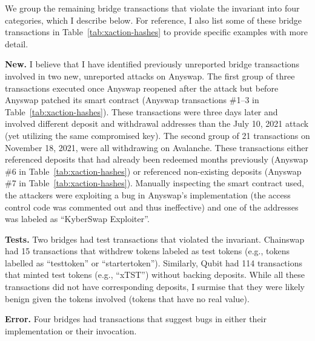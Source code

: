 We group the remaining bridge transactions that violate the invariant
into four categories, which I describe below.  For reference, I also
list some of these bridge transactions in
Table~\ref{tab:xaction-hashes} to provide specific
examples with more detail.



\newcommand{\pgraph}[1]{\vspace*{0.1in}\noindent\textbf{#1}}

\pgraph{New.}  I believe that I have identified
previously unreported bridge transactions involved in two new,
unreported attacks on Anyswap.
The first group of three transactions executed once Anyswap reopened
after the attack but before Anyswap patched its smart contract
(Anyswap transactions \#1--3 in Table~\ref{tab:xaction-hashes}).  These transactions were three days later and involved
different deposit and withdrawal addresses than the July 10, 2021
attack (yet utilizing the same compromised key).  The second group of 21 transactions on November 18, 2021,
were all withdrawing on Avalanche.  These
transactions either referenced deposits that had already been redeemed
months previously (Anyswap \#6 in Table~\ref{tab:xaction-hashes}) or referenced non-existing deposits (Anyswap \#7 in Table~\ref{tab:xaction-hashes}).  Manually
inspecting the smart contract used, the attackers were exploiting a
bug in Anyswap's implementation (the access control code was commented
out and thus ineffective) and one of the addresses was labeled as ``KyberSwap Exploiter''. 


\pgraph{Tests.}  Two bridges had test transactions that violated the
invariant.
%
Chainswap had 15 transactions that withdrew tokens labeled as test
tokens (e.g., tokens labelled as ``testtoken'' or ``startertoken''). Similarly, Qubit had 114 transactions that minted test tokens (e.g., ``xTST'') without backing deposits.
While all these transactions did not have corresponding deposits, I surmise that they were likely benign given the tokens involved (tokens that have no real value).




\pgraph{Error.} Four bridges had transactions that suggest bugs in
either their implementation or their invocation.

